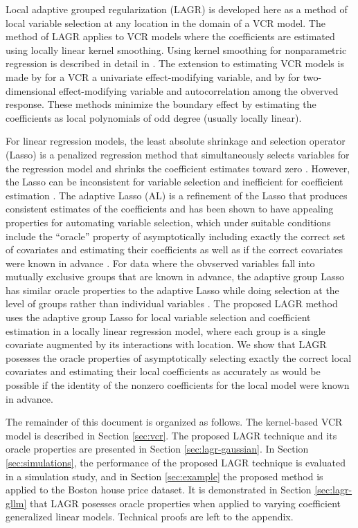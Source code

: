 \documentclass[12pt,english,authoryear, review]{article}\usepackage[]{graphicx}\usepackage[]{color}
\theoremstyle{plain}
\theoremstyle{plain}
\begin{document}
Local adaptive grouped regularization (LAGR) is developed here as
a method of local variable selection at any location in the domain
of a VCR model. The method of LAGR applies to VCR models where the
coefficients are estimated using locally linear kernel smoothing.
Using kernel smoothing for nonparametric regression is described in
detail in \citet*{Fan-Gijbels-1996}. The extension to estimating
VCR models is made by \citet{Fan-Zhang-1999} for a VCR a univariate
effect-modifying variable, and by \citet{Sun-Yan-Zhang-Lu-2014} for
two-dimensional effect-modifying variable and autocorrelation among
the obverved response. These methods minimize the boundary effect
\citep{Hastie:1993b} by estimating the coefficients as local polynomials
of odd degree (usually locally linear).

For linear regression models, the least absolute shrinkage and selection
operator (Lasso) is a penalized regression method that simultaneously
selects variables for the regression model and shrinks the coefficient
estimates toward zero \citep{Tibshirani-1996}. However, the Lasso
can be inconsistent for variable selection and inefficient for coefficient
estimation \citep{Zou-2006}. The adaptive Lasso (AL) is a refinement
of the Lasso that produces consistent estimates of the coefficients
and has been shown to have appealing properties for automating variable
selection, which under suitable conditions include the ``oracle''
property of asymptotically including exactly the correct set of covariates
and estimating their coefficients as well as if the correct covariates
were known in advance \citep{Zou-2006}. For data where the obvserved
variables fall into mutually exclusive groups that are known in advance,
the adaptive group Lasso has similar oracle properties to the adaptive
Lasso while doing selection at the level of groups rather than individual
variables \citep{Yuan-Lin-2006,Wang-Leng-2008}. The proposed LAGR
method uses the adaptive group Lasso for local variable selection
and coefficient estimation in a locally linear regression model, where
each group is a single covariate augmented by its interactions with
location. We show that LAGR posesses the oracle properties of asymptotically
selecting exactly the correct local covariates and estimating their
local coefficients as accurately as would be possible if the identity
of the nonzero coefficients for the local model were known in advance.

The remainder of this document is organized as follows. The kernel-based
VCR model is described in Section \ref{sec:vcr}. The proposed LAGR
technique and its oracle properties are presented in Section \ref{sec:lagr-gaussian}.
In Section \ref{sec:simulations}, the performance of the proposed
LAGR technique is evaluated in a simulation study, and in Section
\ref{sec:example} the proposed method is applied to the Boston house
price dataset. It is demonstrated in Section \ref{sec:lagr-gllm}
that LAGR posesses oracle properties when applied to varying coefficient
generalized linear models. Technical proofs are left to the appendix.
\end{document}
